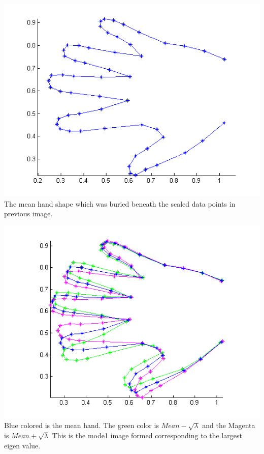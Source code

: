 \documentclass[paper=a4, fontsize=11pt,twoside]{scrartcl}	%
\begin{document}
\includegraphics{HandMean.png}
The mean hand shape which was buried beneath the scaled data points in previous image.

\includegraphics{HandMode1.png}
Blue colored is the mean hand. The green color is $Mean - \sqrt{\lambda}$ and the Magenta is $Mean + \sqrt{\lambda}$ This is the mode1 image formed corresponding to the largest eigen value. 
\end{document}
